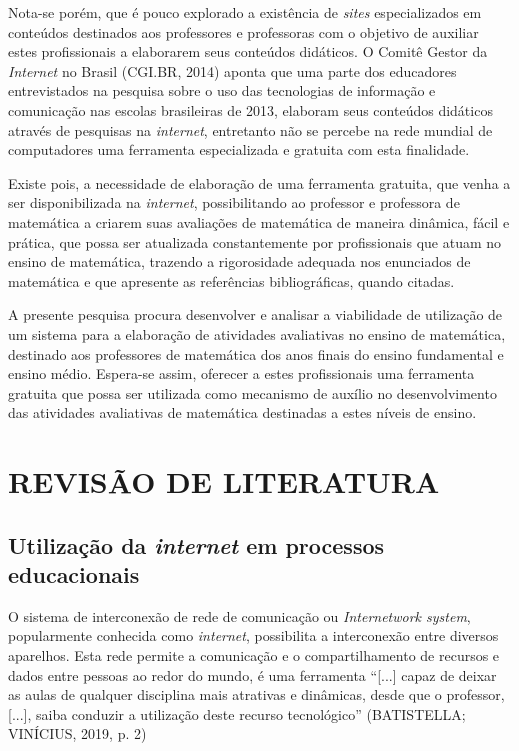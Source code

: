 \documentclass{IFNMG}
\begin{document}
Nota-se porém, que é pouco explorado a existência de \textit{sites} especializados em conteúdos destinados aos professores e professoras com o objetivo de auxiliar estes profissionais a elaborarem seus conteúdos didáticos. O Comitê Gestor da \textit{Internet} no Brasil (CGI.BR, 2014) aponta que uma parte dos educadores entrevistados na pesquisa sobre o uso das tecnologias de informação e comunicação nas escolas brasileiras de 2013, elaboram seus conteúdos didáticos através de pesquisas na \textit{internet}, entretanto não se percebe na rede mundial de computadores uma ferramenta especializada e gratuita com esta finalidade.

Existe pois, a necessidade de elaboração de uma ferramenta gratuita, que venha a ser disponibilizada na \textit{internet}, possibilitando ao professor e professora de matemática a criarem suas avaliações de matemática de maneira dinâmica, fácil e prática, que possa ser atualizada constantemente por profissionais que atuam no ensino de matemática, trazendo a rigorosidade adequada nos enunciados de matemática e que apresente as referências bibliográficas, quando citadas.

A presente pesquisa procura desenvolver e analisar a viabilidade de utilização de um sistema para a elaboração de atividades avaliativas no ensino de matemática, destinado aos professores de matemática dos anos finais do ensino fundamental e ensino médio. Espera-se assim, oferecer a estes profissionais uma ferramenta gratuita que possa ser utilizada como mecanismo de auxílio no desenvolvimento das atividades avaliativas de matemática destinadas a estes níveis de ensino.

\newpage
\section{REVISÃO DE LITERATURA}
\subsection{Utilização da \textit{internet} em processos educacionais}

O sistema de interconexão de rede de comunicação ou \textit{Internetwork system}, popularmente conhecida como \textit{internet}, possibilita a interconexão entre diversos aparelhos. Esta rede permite a comunicação e o compartilhamento de recursos e dados entre pessoas ao redor do mundo, é uma ferramenta “[...] capaz de deixar as aulas de qualquer disciplina mais atrativas e dinâmicas, desde que o professor, [...], saiba conduzir a utilização deste recurso tecnológico” (BATISTELLA; VINÍCIUS, 2019, p. 2)
\end{document}
